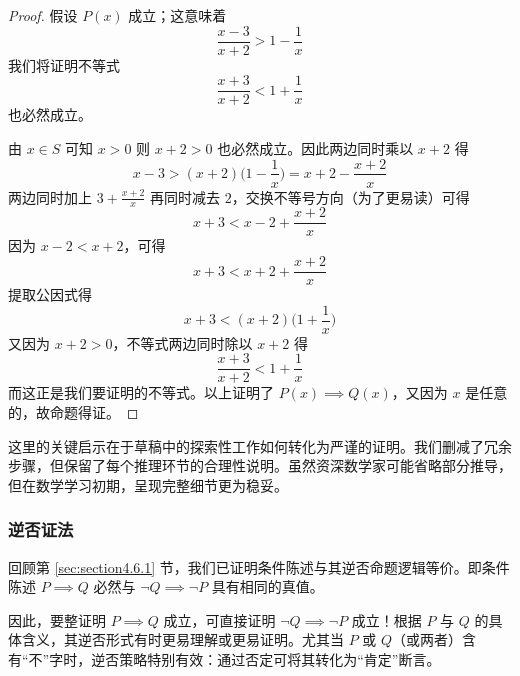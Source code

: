 \begin{example}[解决不等式问题]
\begin{center}
{{\begin{proof}
                    假设 $P(x)$ 成立；这意味着
                    \[\frac{x-3}{x+2}>1-\frac{1}{x}\]
                    我们将证明不等式
                    \[\frac{x+3}{x+2}<1+\frac{1}{x}\]
                    也必然成立。
                    
                    由 $x \in S$ 可知 $x>0$ 则 $x+2>0$ 也必然成立。因此两边同时乘以 $x+2$ 得
                    \[x-3 > (x+2)\Big(1-\frac{1}{x}\Big)=x+2-\frac{x+2}{x}\]
                    两边同时加上 $3+\frac{x+2}{x}$ 再同时减去 $2$，交换不等号方向（为了更易读）可得
                    \[x+3<x-2+\frac{x+2}{x}\]
                    因为 $x-2<x+2$，可得
                    \[x+3<x+2+\frac{x+2}{x}\]
                    提取公因式得
                    \[x+3<(x+2)\Big(1+\frac{1}{x}\Big)\]
                    又因为 $x+2>0$，不等式两边同时除以 $x+2$ 得
                    \[\frac{x+3}{x+2}<1+\frac{1}{x}\]
                    而这正是我们要证明的不等式。以上证明了 $P(x) \implies Q(x)$，又因为 $x$ 是任意的，故命题得证。
                \end{proof}
            }
        }
    \end{center}
\end{example}

这里的关键启示在于草稿中的探索性工作如何转化为严谨的证明。我们删减了冗余步骤，但保留了每个推理环节的合理性说明。虽然资深数学家可能省略部分推导，但在数学学习初期，呈现完整细节更为稳妥。

\subsubsection*{逆否证法}

回顾第 \ref{sec:section4.6.1} 节，我们已证明条件陈述与其逆否命题逻辑等价。即条件陈述 $P \implies Q$ 必然与 $\neg Q \implies \neg P$ 具有相同的真值。

因此，要整证明 $P \implies Q$ 成立，可直接证明 $\neg Q \implies \neg P$ 成立！根据 $P$ 与 $Q$ 的具体含义，其逆否形式有时更易理解或更易证明。尤其当 $P$ 或 $Q$（或两者）含有``不''字时，逆否策略特别有效：通过否定可将其转化为``肯定''断言。

\begin{center}
    \noindent {}
\end{center}

